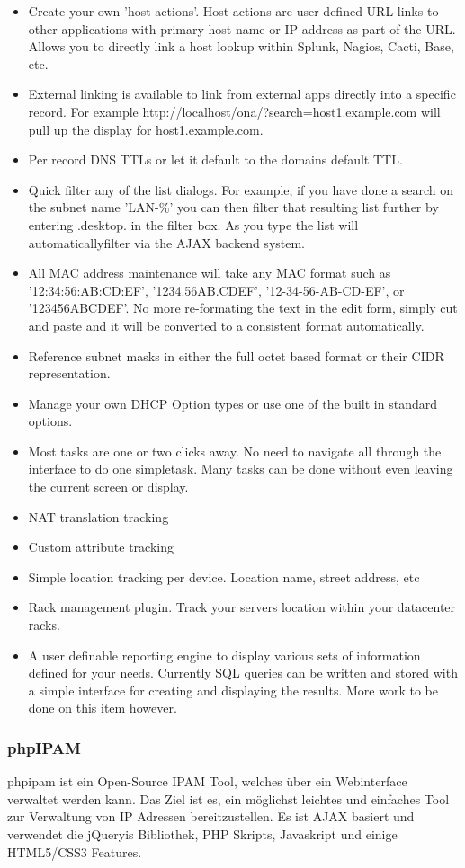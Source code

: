 \documentclass[11pt,a4paper,parskip=half]{scrartcl}
\begin{document}
\begin{itemize}
\item{Create your own 'host actions'. Host actions are user defined URL links to other applications with primary host name or IP address as part of the URL. Allows you to directly link a host lookup within Splunk, Nagios, Cacti, Base, etc.}
\item{External linking is available to link from external apps directly into a specific record. For example http://localhost/ona/?search=host1.example.com will pull up the display for host1.example.com.}
\item{Per record DNS TTLs or let it default to the domains default TTL.}
\item{Quick filter any of the list dialogs. For example, if you have done a search on the subnet name 'LAN-\%' you can then filter that resulting list further by entering .desktop. in the filter box. As you type the list will automaticallyfilter via the AJAX backend system.}
\item{All MAC address maintenance will take any MAC format such as '12:34:56:AB:CD:EF', '1234.56AB.CDEF', '12-34-56-AB-CD-EF', or '123456ABCDEF'. No more re-formating the text in the edit form, simply cut and paste and it will be converted to a consistent format automatically.}
\item{Reference subnet masks in either the full octet based format or their CIDR representation.}
\item{Manage your own DHCP Option types or use one of the built in standard options.}
\item{Most tasks are one or two clicks away. No need to navigate all through the interface to do one simpletask. Many tasks can be done without even leaving the current screen or display.}
\item{NAT translation tracking}
\item{Custom attribute tracking}
\item{Simple location tracking per device. Location name, street address, etc}
\item{Rack management plugin. Track your servers location within your datacenter racks.}
\item{A user definable reporting engine to display various sets of information defined for your needs. Currently SQL queries can be written and stored with a simple interface for creating and displaying the results. More work to be done on this item however.}
\end{itemize}

\subsubsection{phpIPAM}
phpipam ist ein Open-Source IPAM Tool, welches über ein Webinterface verwaltet werden kann. Das Ziel ist es, ein möglichst leichtes und einfaches Tool zur Verwaltung von IP Adressen bereitzustellen. Es ist AJAX basiert und verwendet die jQueryis Bibliothek, PHP Skripts, Javaskript und einige HTML5/CSS3 Features.
\end{document}

